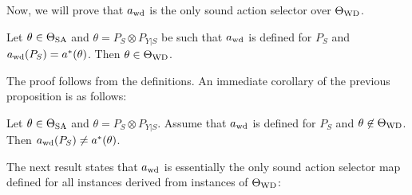 Now, we will prove that $a_{\mathrm{wd}}$ is the only sound action selector over $\Theta_{\mathrm{WD}}$.
\begin{prop}
	\label{prop:awdcorrectimplieswd}
	Let $\theta \in \Theta_{\mathrm{SA}}$ and $\theta = P_S\otimes P_{Y|S}$ be such that $a_{\mathrm{wd}}$ is defined for $P_S$
	and $a_{\mathrm{wd}}(P_S) = a^*(\theta)$. Then $\theta \in \Theta_{\mathrm{WD}}$.
\end{prop}
The proof follows from the definitions. An immediate corollary of the previous proposition is as follows:
\begin{cor}\label{cor:awdoutsideincorrect}
	Let $\theta \in \Theta_{\mathrm{SA}}$ and $\theta = P_S \otimes P_{Y|S}$. 
	Assume that $a_{\mathrm{wd}}$ is defined for $P_S$ and $\theta \not\in \Theta_{\mathrm{WD}}$. Then $a_{\mathrm{wd}}(P_S) \ne a^*(\theta)$.
\end{cor}

The next result states that $a_{\mathrm{wd}}$ is essentially the only sound action selector map defined for
all instances derived from instances of $\Theta_{\mathrm{WD}}$:

